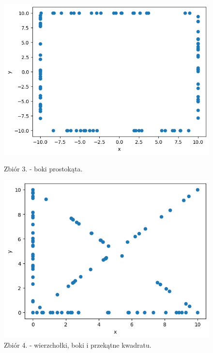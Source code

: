 \documentclass[11pt]{scrartcl}
\begin{document}
    \begin{figure}[H]
        \centering
        \begin{minipage}{0.45\linewidth}
          \centering
          \includegraphics[width=1\linewidth]{2_3.png}
          \caption{Zbiór 3. - boki prostokąta.}
        \end{minipage}
        \begin{minipage}{0.45\linewidth}
          \centering
          \includegraphics[width=1\linewidth]{2_4.png}
          \caption{Zbiór 4. - wierzchołki, boki i przekątne kwadratu.}
        \end{minipage}
    \end{figure}
\end{document}
